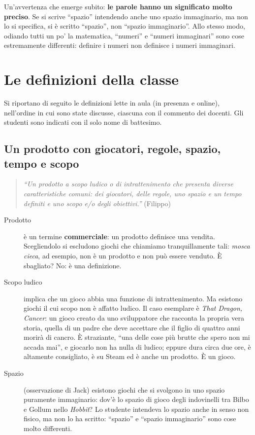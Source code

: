Un'avvertenza che emerge subito: \textbf{le parole hanno un significato molto
preciso}. Se si scrive ``spazio'' intendendo anche uno spazio immaginario, ma
non lo si specifica, si è scritto ``spazio'', non ``spazio immaginario''. Allo
stesso modo, odiando tutti un po' la matematica, ``numeri'' e ``numeri
immaginari'' sono cose estremamente differenti: definire i numeri non
definisce i numeri immaginari.

\section{Le definizioni della classe}
\label{sec:definizioni-classe}

Si riportano di seguito le definizioni lette in aula (in presenza e online),
nell'ordine in cui sono state discusse, ciascuna con il commento dei docenti.
Gli studenti sono indicati con il solo nome di battesimo.

\subsection{Un prodotto con giocatori, regole, spazio, tempo e scopo}

\begin{quote}
\emph{``Un prodotto a scopo ludico o di intrattenimento che presenta diverse
caratteristiche comuni: dei giocatori, delle regole, uno spazio e un tempo
definiti e uno scopo e/o degli obiettivi.''} (Filippo)
\end{quote}

\begin{description}
  \item[Prodotto] è un termine \textbf{commerciale}: un prodotto definisce una
        vendita. Scegliendolo si escludono giochi che chiamiamo
        tranquillamente tali: \emph{mosca cieca}, ad esempio, non è un
        prodotto e non può essere venduto. È sbagliato? No: è una definizione.
  \item[Scopo ludico] implica che un gioco abbia una funzione di
        intrattenimento. Ma esistono giochi il cui scopo non è affatto ludico.
        Il caso esemplare è \emph{That Dragon, Cancer}: un gioco creato da uno
        sviluppatore che racconta la propria vera storia, quella di un padre
        che deve accettare che il figlio di quattro anni morirà di cancro. È
        straziante, ``una delle cose più brutte che spero non mi accada mai'',
        e giocarlo non ha nulla di ludico; eppure dura circa due ore, è
        altamente consigliato, è su Steam ed è anche un prodotto. È un gioco.
  \item[Spazio] (osservazione di Jack) esistono giochi che si svolgono in uno
        spazio puramente immaginario: dov'è lo spazio di gioco degli
        indovinelli tra Bilbo e Gollum nello \emph{Hobbit}? Lo studente
        intendeva lo spazio anche in senso non fisico, ma non lo ha scritto:
        ``spazio'' e ``spazio immaginario'' sono cose molto differenti.
\end{description}

